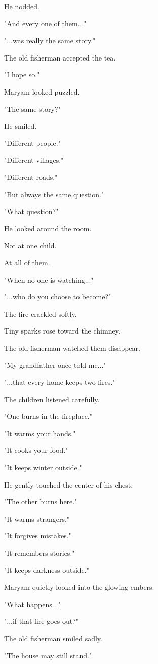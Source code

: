 \documentclass[12pt,openany]{book}
\begin{document}
He nodded.

"And every one of them..."

"...was really the same story."

The old fisherman accepted the tea.

"I hope so."

Maryam looked puzzled.

"The same story?"

He smiled.

"Different people."

"Different villages."

"Different roads."

"But always the same question."

"What question?"

He looked around the room.

Not at one child.

At all of them.

"When no one is watching..."

"...who do you choose to become?"

The fire crackled softly.

Tiny sparks rose toward the chimney.

The old fisherman watched them disappear.

"My grandfather once told me..."

"...that every home keeps two fires."

The children listened carefully.

"One burns in the fireplace."

"It warms your hands."

"It cooks your food."

"It keeps winter outside."

He gently touched the center of his chest.

"The other burns here."

"It warms strangers."

"It forgives mistakes."

"It remembers stories."

"It keeps darkness outside."

Maryam quietly looked into the glowing embers.

"What happens..."

"...if that fire goes out?"

The old fisherman smiled sadly.

"The house may still stand."
\end{document}
